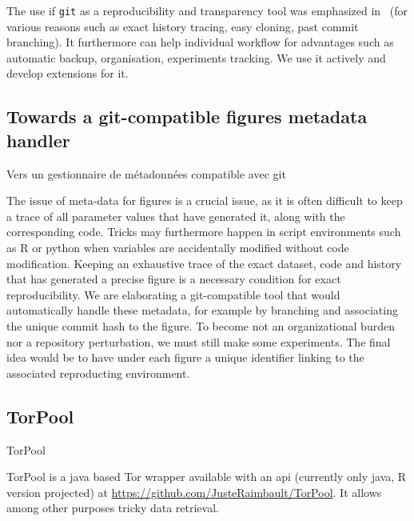 The use if \texttt{git} as a reproducibility and transparency tool was emphasized in~\cite{ram2013git} (for various reasons such as exact history tracing, easy cloning, past commit branching). It furthermore can help individual workflow for advantages such as automatic backup, organisation, experiments tracking. We use it actively and develop extensions for it.







\subsection{Towards a git-compatible figures metadata handler}{Vers un gestionnaire de métadonnées compatible avec git}

The issue of meta-data for figures is a crucial issue, as it is often difficult to keep a trace of all parameter values that have generated it, along with the corresponding code. Tricks may furthermore happen in script environments such as R or python when variables are accidentally modified without code modification. Keeping an exhaustive trace of the exact dataset, code and history that has generated a precise figure is a necessary condition for exact reproducibility. We are elaborating a git-compatible tool that would automatically handle these metadata, for example by branching and associating the unique commit hash to the figure. To become not an organizational burden nor a repository perturbation, we must still make some experiments. The final idea would be to have under each figure a unique identifier linking to the associated reproducting environment.


\subsection{TorPool}{TorPool}

TorPool is a java based Tor wrapper available with an api (currently only java, R version projected) at \url{https://github.com/JusteRaimbault/TorPool}. It allows among other purposes tricky data retrieval.

